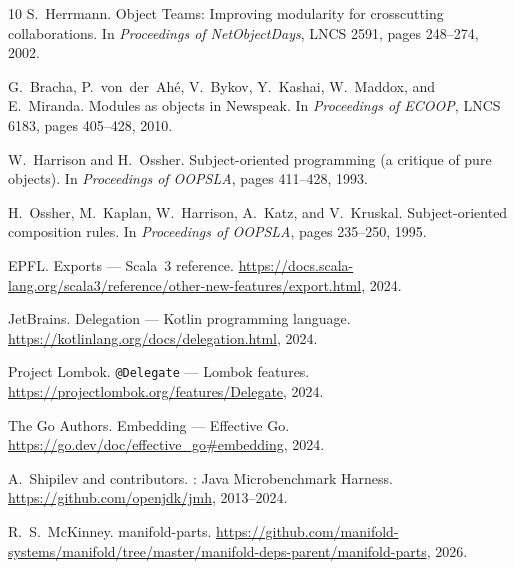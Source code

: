 \documentclass[acmsmall,nonacm]{acmart}
\theoremstyle{acmplain}
\begin{document}
\begin{thebibliography}{10}
S.~Herrmann.
\newblock Object {Teams}: Improving modularity for crosscutting collaborations.
\newblock In {\em Proceedings of NetObjectDays}, LNCS 2591, pages 248--274, 2002.

G.~Bracha, P.~von~der~Ah{\'e}, V.~Bykov, Y.~Kashai, W.~Maddox, and E.~Miranda.
\newblock Modules as objects in {Newspeak}.
\newblock In {\em Proceedings of ECOOP}, LNCS 6183, pages 405--428, 2010.

W.~Harrison and H.~Ossher.
\newblock Subject-oriented programming (a critique of pure objects).
\newblock In {\em Proceedings of OOPSLA}, pages 411--428, 1993.

H.~Ossher, M.~Kaplan, W.~Harrison, A.~Katz, and V.~Kruskal.
\newblock Subject-oriented composition rules.
\newblock In {\em Proceedings of OOPSLA}, pages 235--250, 1995.

EPFL.
\newblock Exports --- {Scala~3} reference.
\newblock \url{https://docs.scala-lang.org/scala3/reference/other-new-features/export.html}, 2024.

JetBrains.
\newblock Delegation --- {Kotlin} programming language.
\newblock \url{https://kotlinlang.org/docs/delegation.html}, 2024.

Project Lombok.
\newblock \texttt{@Delegate} --- {Lombok} features.
\newblock \url{https://projectlombok.org/features/Delegate}, 2024.

The Go Authors.
\newblock Embedding --- Effective {Go}.
\newblock \url{https://go.dev/doc/effective_go#embedding}, 2024.

A.~Shipilev and contributors.
: Java Microbenchmark Harness.
\newblock \url{https://github.com/openjdk/jmh}, 2013--2024.

R.~S.~McKinney.
\newblock manifold-parts.
\newblock \url{https://github.com/manifold-systems/manifold/tree/master/manifold-deps-parent/manifold-parts}, 2026.

\end{thebibliography}
\end{document}
